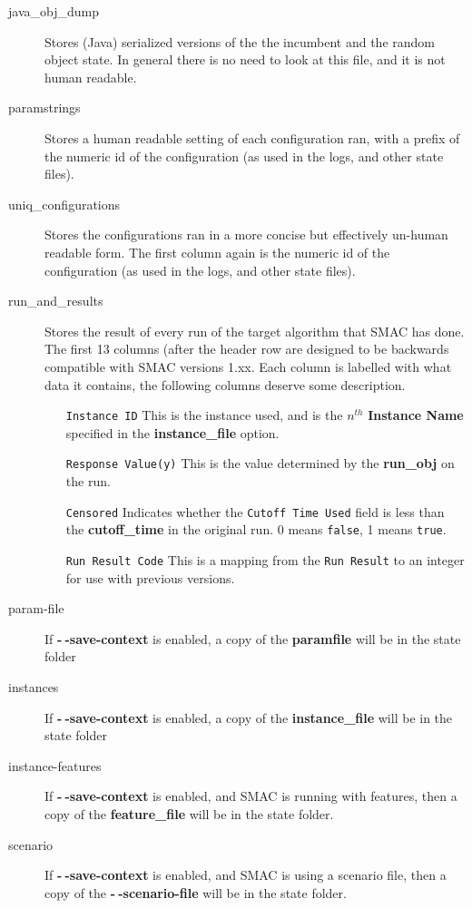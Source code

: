 \documentclass[manual.tex]{subfiles}
\begin{document}
\begin{description}
\item[java\_obj\_dump] Stores (Java) serialized versions of the the incumbent and the random object state. In general there is no need to look at this file, and it is not human readable.

\item[paramstrings]	  Stores a human readable setting of each configuration ran, with a prefix of the numeric id of the configuration (as used in the logs, and other state files).

\item[uniq\_configurations] Stores the configurations ran in a more concise but effectively un-human readable form. The first column again is the numeric id of the configuration (as used in the logs, and other state files).

\item[run\_and\_results] Stores the result of every run of the target algorithm that SMAC has done. The first 13 columns (after the header row are designed to be backwards compatible with SMAC versions 1.xx. Each column is labelled with what data it contains, the following columns deserve some description.
	\begin{enumerate}
	\item[\texttt{Instance ID}]	This is the instance used, and is the $n^{th}$ \textbf{Instance Name} specified in the \textbf{instance\_file} option.
	\item[\texttt{Response Value(y)}]  This is the value determined by the \textbf{run\_obj} on the run.
	\item[\texttt{Censored}] Indicates whether the \texttt{Cutoff Time Used} field is less than the \textbf{cutoff\_time} in the original run. 0 means \texttt{false}, 1 means \texttt{true}.
	\item[\texttt{Run Result Code}]	This is a mapping from the \texttt{Run Result} to an integer for use with previous versions.
	\end{enumerate}
	
	\item[param-file] If \textbf{-$~\!$-save-context} is enabled, a copy of the \textbf{paramfile} will be in the state folder 
	
	\item[instances] If \textbf{-$~\!$-save-context} is enabled, a copy of the \textbf{instance\_file} will be in the state folder 
	
	\item[instance-features] If \textbf{-$~\!$-save-context} is enabled, and SMAC is running with features, then a copy of the \textbf{feature\_file} will be in the state folder.

	\item[scenario] If \textbf{-$~\!$-save-context} is enabled, and SMAC is using a scenario file, then a copy of the  \textbf{-$~\!$-scenario-file} will be in the state folder.
	
	
		
	
\end{description}
\end{document}
